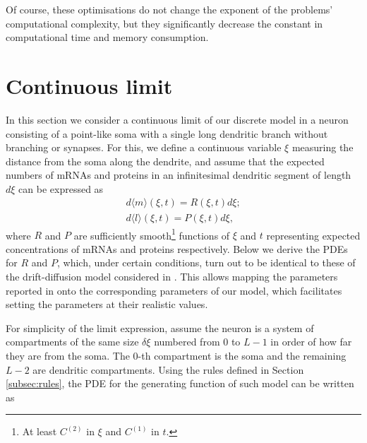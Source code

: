 \documentclass[a4paper, 11pt]{article}
\begin{document}
Of course, these optimisations do not change the exponent of the problems' computational complexity, but they significantly decrease the constant in computational time and memory consumption.

\appendix \label{app:DDM_correspondence}
\section{Continuous limit}
In this section we consider a continuous limit of our discrete model in a neuron consisting of a point-like soma with a single long dendritic branch without branching or synapses. For this, we define a continuous variable $\xi$ measuring the distance from the soma along the dendrite, and assume that the expected numbers of mRNAs and proteins in an infinitesimal dendritic segment of length $d\xi$ can be expressed as
\begin{align*}
  d\langle m\rangle (\xi,t) = R(\xi,t)d\xi;\\
  d\langle l\rangle (\xi,t) = P(\xi,t)d\xi,
\end{align*}
where $R$ and $P$ are sufficiently smooth\footnote{At least $C^{(2)}$ in $\xi$ and $C^{(1)}$ in $t$.} functions of $\xi$ and $t$ representing expected concentrations of mRNAs and proteins respectively. Below we derive the PDEs for $R$ and $P$, which, under certain conditions, turn out to be identical to these of the drift-diffusion model considered in \cite{PMID:31350097}. This allows mapping the parameters reported in \cite{PMID:31350097} onto the corresponding parameters of our model, which facilitates setting the parameters at their realistic values.



For simplicity of the limit expression, assume the neuron is a system of compartments of the same size $\delta\xi$ numbered from $0$ to $L-1$ in order of how far they are from the soma. The 0-th compartment is the soma and the remaining $L-2$ are dendritic compartments. Using the rules defined in Section \ref{subsec:rules}, the PDE for the generating function of such model can be written as
\end{document}
